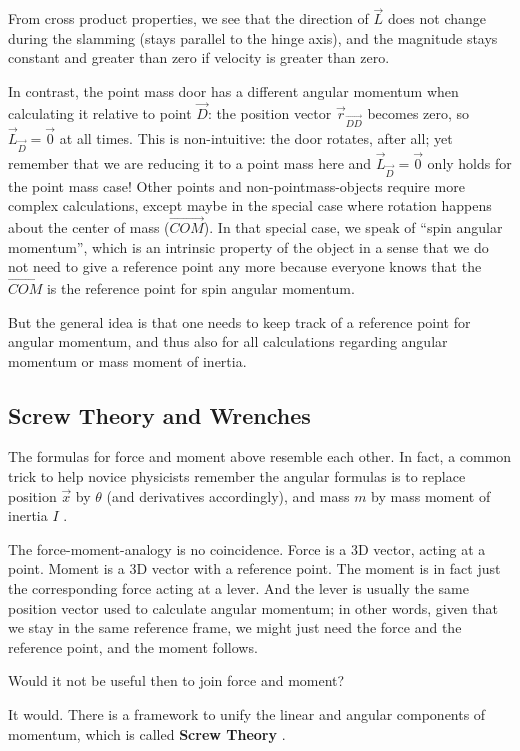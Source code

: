From cross product properties, we see that the direction of \(\vec{L}\) does not change during the slamming (stays parallel to the hinge axis), and the magnitude stays constant and greater than zero if velocity is greater than zero.

In contrast, the point mass door has a different angular momentum when calculating it relative to point \(\vec{D}\): the position vector \(\vec{r}_{\vec{DD}}\) becomes zero, so \(\vec{L}_{\vec{D}} = \vec{0}\) at all times.
This is non-intuitive: the door rotates, after all; yet remember that we are reducing it to a point mass here and \(\vec{L}_{\vec{D}} = \vec{0}\) only holds for the point mass case!
Other points and non-pointmass-objects require more complex calculations, except maybe in the special case where rotation happens about the center of mass (\(\vec{COM}\)).
In that special case, we speak of ``spin angular momentum'', which is an intrinsic property of the object in a sense that we do not need to give a reference point any more because everyone knows that the \(\vec{COM}\) is the reference point for spin angular momentum.


But the general idea is that one needs to keep track of a reference point for angular momentum, and thus also for all calculations regarding angular momentum or mass moment of inertia.


\FloatBarrier
\subsection{Screw Theory and Wrenches}
\label{sec:org9e002ef}

The formulas for force and moment above resemble each other.
In fact, a common trick to help novice physicists remember the angular formulas is to replace position \(\vec{x}\) by \(\theta\) (and derivatives accordingly), and mass \(m\) by mass moment of inertia \(I\) \citep{Tipler2007}.

The force-moment-analogy is no coincidence.
Force is a 3D vector, acting at a point.
Moment is a 3D vector with a reference point.
The moment is in fact just the corresponding force acting at a lever.
And the lever is usually the same position vector used to calculate angular momentum; in other words, given that we stay in the same reference frame, we might just need the force and the reference point, and the moment follows.

Would it not be useful then to join force and moment?


It would.
There is a framework to unify the linear and angular components of momentum, which is called \textbf{Screw Theory} \citep{Ball1876,Lynch2017}.


